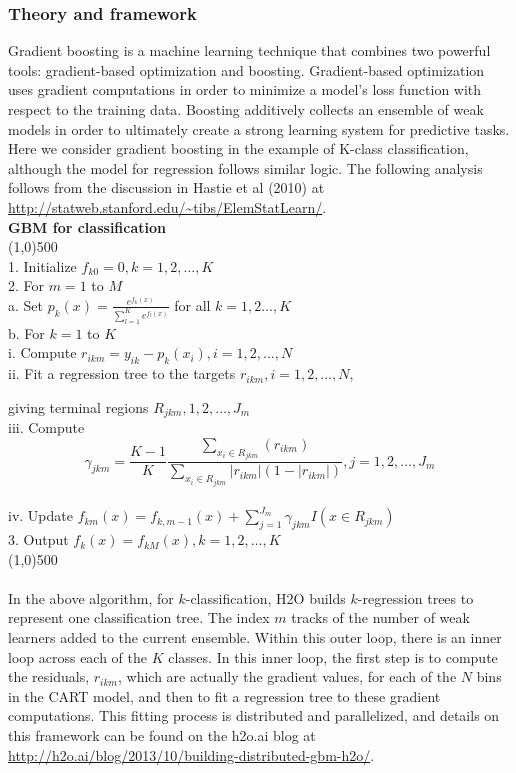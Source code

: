 \documentclass[11pt]{article}
\begin{document}
{\subsubsection{Theory and framework} 

Gradient boosting is a machine learning technique that combines two powerful tools: gradient-based optimization and boosting. Gradient-based optimization uses gradient computations in order to minimize a model's loss function with respect to the training data. Boosting additively collects an ensemble of weak models in order to ultimately create a strong learning system for predictive tasks. Here we consider gradient boosting in the example of K-class classification, although the model for regression follows similar logic. The following analysis follows from the discussion in Hastie et al (2010) at {\url{http://statweb.stanford.edu/~tibs/ElemStatLearn/}}.
\newline
\\
{\bf{\footnotesize{GBM for classification}}}
\\
\line(1,0){500}
\\ 
1. Initialize $f_{k0} = 0, k = 1,2,\dots,K$ 
\\
2. For $m=1$ to $M$
\\
\indent a. Set $p_k(x) = \frac{e^{f_k(x)}}{\sum_{l=1}^K e^{f_l(x)}}$ for all $k = 1,2\dots, K$
\\
\indent b. For $k=1$ to $K$
\\
\indent \indent i. Compute $r_{ikm} = y_{ik} - p_k(x_i),  i = 1,2,\dots,N$
\\
\indent \indent ii. Fit a regression tree to the targets $r_{ikm}, i = 1,2,\dots,N$, 
\par \hspace{3em} giving terminal regions $R_{jkm}, 1,2,\dots,J_m$
\\
\indent \indent iii. Compute $$\gamma_{jkm} = \frac{K-1}{K} \frac{\sum_{x_i \in R_{jkm}} (r_{ikm})}{\sum_{x_i \in R_{jkm}} |r_{ikm}| (1 - |r_{ikm}|)} , j=1,2,\dots,J_m$$
\\
\indent \indent iv. Update $f_{km}(x) = f_{k,m-1}(x) + \sum_{j=1}^{J_m} \gamma_{jkm} I(x \in R_{jkm})$
\\
3. Output $f_k^{\hat{}}(x) = f_{kM}(x),  k=1,2,\dots,K$
\\
\line(1,0){500}
\\
\\ 
In the above algorithm, for $k$-classification, H2O builds $k$-regression trees to represent one classification tree. The index $m$ tracks of the number of weak learners added to the current ensemble. Within this outer loop, there is an inner loop across each of the $K$ classes. In this inner loop, the first step is to compute the residuals, $r_{ikm}$, which are actually the gradient values, for each of the $N$ bins in the CART model, and then to fit a regression tree to these gradient computations. This fitting process is distributed and parallelized, and details on this framework can be found on the h2o.ai blog at {\url{http://h2o.ai/blog/2013/10/building-distributed-gbm-h2o/}}.
}
\end{document}
